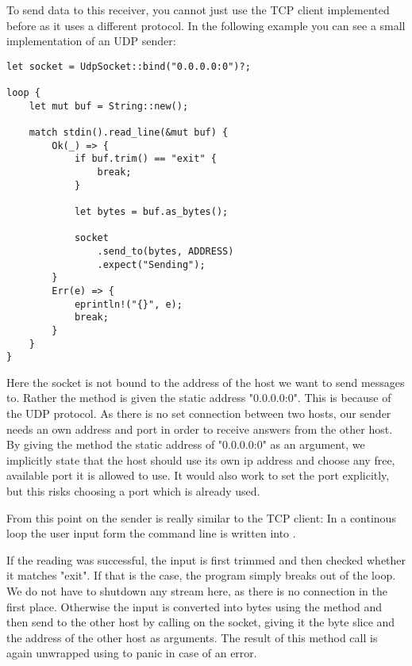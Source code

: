 To send data to this receiver, you cannot just use the TCP client implemented before as it uses a different protocol. In
the following example you can see a small implementation of an UDP sender:

\begin{verbatim}
let socket = UdpSocket::bind("0.0.0.0:0")?;

loop {
    let mut buf = String::new();

    match stdin().read_line(&mut buf) {
        Ok(_) => {
            if buf.trim() == "exit" {
                break;
            }

            let bytes = buf.as_bytes();

            socket
                .send_to(bytes, ADDRESS)
                .expect("Sending");
        }
        Err(e) => {
            eprintln!("{}", e);
            break;
        }
    }
}
\end{verbatim}

Here the socket is not bound to the address of the host we want to send messages to. Rather the  method is
given the static address "0.0.0.0:0". This is because of the UDP protocol. As there is no set connection between two
hosts, our sender needs an own address and port in order to receive answers from the other host. By giving the
 method the static address of "0.0.0.0:0" as an argument, we implicitly state that the host should use its
own ip address and choose any free, available port it is allowed to use. It would also work to set the port explicitly,
but this risks choosing a port which is already used.

From this point on the sender is really similar to the TCP client: In a continous loop the user input form the command
line is written into .

If the reading was successful, the input is first trimmed and then checked whether it
matches "exit". If that is the case, the program simply breaks out of the loop. We do not have to shutdown any stream
here, as there is no connection in the first place. Otherwise the input is converted into bytes using the method
 and then send to the other host by calling  on the socket, giving it the byte slice and
the address of the other host as arguments. The result of this method call is again unwrapped using  to
panic in case of an error.
